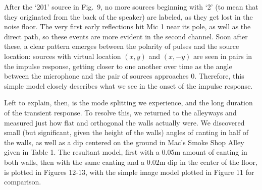 \documentclass{aes137}
\begin{document}
After the `201' source in Fig.~9, no more sources beginning with
`2' (to mean that they originated from the back of the speaker) are
labeled, as they get lost in the noise floor. The very first early reflections hit Mic 1 near its pole, as
well as the direct path, so these events are more evident in the second channel. Soon after these, a clear pattern emerges between the polarity of pulses
and the source location: sources with virtual location $(x,y)$ and
$(x,-y)$ are seen in pairs in the impulse response, getting closer to one another over time
as the angle between the microphone and the pair of sources approaches 0. Therefore, this simple model closely describes what we see in the onset of the impulse response. 

%


Left to explain, then, is the mode splitting we
experience, and the long duration of the transient response. To resolve this, we returned to the
alleyways and measured just how flat and orthogonal the walls actually
were. We discovered small (but significant, given the height of the
walls) angles of canting in half of the walls, as well as a dip
centered on the ground in Mac's Smoke Shop Alley given in Table 1. The resultant model, first with a 0.05m amount of canting in both walls, then with the same canting and a 0.02m dip in the center of the floor, is plotted in Figures 12-13, with the simple image model plotted in Figure 11 for comparison.
\end{document}
